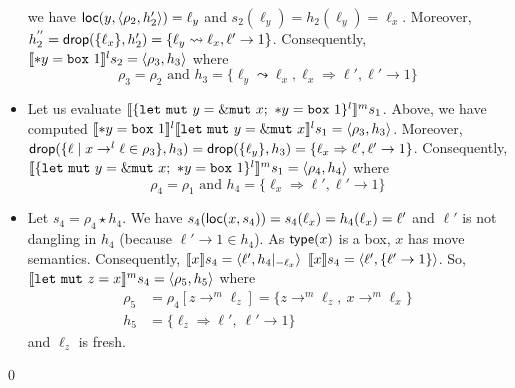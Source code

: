 \begin{example}
\begin{itemize}
    we have $\loc(y,\langle\rho_2,h'_2\rangle) = \ell_y$ and
    $s_2(\ell_y) = h_2(\ell_y) = \ell_x$.
    Moreover, $h^{''}_2=\drop(\{\ell_x\},h'_2) =
    \{\ell_y\leadsto \ell_x,\ell'\to 1\}$. Consequently,
    $\denl[\mathtt{*}y = \mathtt{box}\ 1]{l}{s_2} =
    \langle\rho_3,h_3\rangle$ where
    \[\rho_3 = \rho_2
    \text{ and }
    h_3 = \{\ell_y\leadsto\ell_x,\ell_x\Rightarrow\ell',
    \ell'\to 1\}\]
    \item Let us evaluate
    $\denl[\{\mathtt{let\ mut}\ y = \mutborrow x;\
    \mathtt{*}y = \mathtt{box}\ 1\}^l]{m}{s_1}$. Above, we have
    computed $\denl[\mathtt{*}y = \mathtt{box}\ 1]{l}{
    \denl[\mathtt{let\ mut}\ y = \mutborrow x]{l}{s_1}} =
    \langle\rho_3,h_3\rangle$. Moreover,
    $\drop(\{\ell\mid x\to^l\ell\in\rho_3\},h_3) = \drop(\{\ell_y\},h_3) =
    \{\ell_x\Rightarrow\ell',\ell'\to 1\}$. Consequently,
    $\denl[\{\mathtt{let\ mut}\ y = \mutborrow x;\
    \mathtt{*}y = \mathtt{box}\ 1\}^l]{m}{s_1} =
    \langle \rho_4,h_4\rangle$ where
    \[\rho_4 = \rho_1 \text{ and } h_4 = \{\ell_x\Rightarrow\ell',\ell'\to 1\}\]
    \item Let $s_4 = \rho_4 \star h_4$. We have
    $s_4(\loc(x,s_4)) = s_4(\ell_x) = h_4(\ell_x)=\ell'$ and
    $\ell'$ is not dangling in $h_4$ (because $\ell'\to 1 \in h_4$).
    As $\type(x)$ is a box, $x$ has move semantics. Consequently,
    $\den[x]{s_4} = \langle \ell', {h_4}|_{-\ell_x}\rangle$\ie
    $\den[x]{s_4} = \langle \ell', \{\ell'\to 1\} \rangle$.
    So, $\denl[\mathtt{let\ mut}\ z = x]{m}{s_4} = \langle \rho_5,h_5\rangle$
    where
    \begin{align*}
      \rho_5 & = \rho_4[z\to^m \ell_z] = \{z\to^m \ell_z,\ x\to^m\ell_x\}\\
      h_5 & = \{\ell_z\Rightarrow \ell',\ \ell'\to 1\}
    \end{align*}
    and $\ell_z$ is fresh.
  \end{itemize}
  \qed
\end{example}

